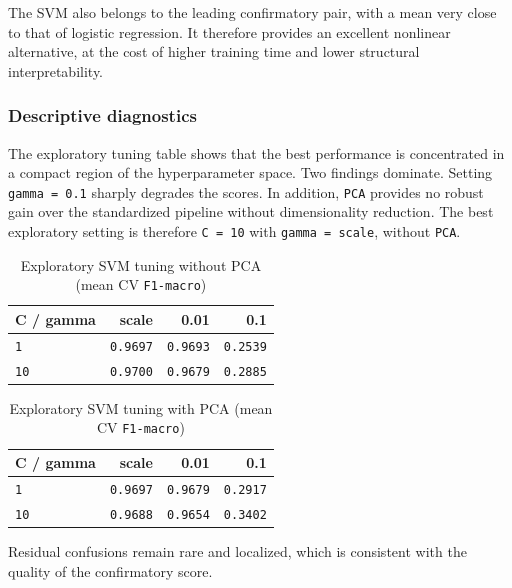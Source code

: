 The SVM also belongs to the leading confirmatory pair, with a mean very close to that of logistic regression. It therefore provides an excellent nonlinear alternative, at the cost of higher training time and lower structural interpretability.

\subsubsection{Descriptive diagnostics}
\begin{sloppypar}
The exploratory tuning table shows that the best performance is concentrated in a compact region of the hyperparameter space. Two findings dominate. Setting \texttt{gamma = 0.1} sharply degrades the scores. In addition, \texttt{PCA} provides no robust gain over the standardized pipeline without dimensionality reduction. The best exploratory setting is therefore \texttt{C = 10} with \texttt{gamma = scale}, without \texttt{PCA}.
\end{sloppypar}

\begin{table}[H]
\centering
\begin{tabular}{|l|r|r|r|}
\hline
\textbf{C / gamma} & \textbf{scale} & \textbf{0.01} & \textbf{0.1} \\
\hline
\texttt{1} & \texttt{0.9697} & \texttt{0.9693} & \texttt{0.2539} \\
\texttt{10} & \texttt{0.9700} & \texttt{0.9679} & \texttt{0.2885} \\
\hline
\end{tabular}
\caption{Exploratory SVM tuning without PCA (mean CV \texttt{F1-macro})}
\end{table}

\begin{table}[H]
\centering
\begin{tabular}{|l|r|r|r|}
\hline
\textbf{C / gamma} & \textbf{scale} & \textbf{0.01} & \textbf{0.1} \\
\hline
\texttt{1} & \texttt{0.9697} & \texttt{0.9679} & \texttt{0.2917} \\
\texttt{10} & \texttt{0.9688} & \texttt{0.9654} & \texttt{0.3402} \\
\hline
\end{tabular}
\caption{Exploratory SVM tuning with PCA (mean CV \texttt{F1-macro})}
\end{table}

Residual confusions remain rare and localized, which is consistent with the quality of the confirmatory score.

